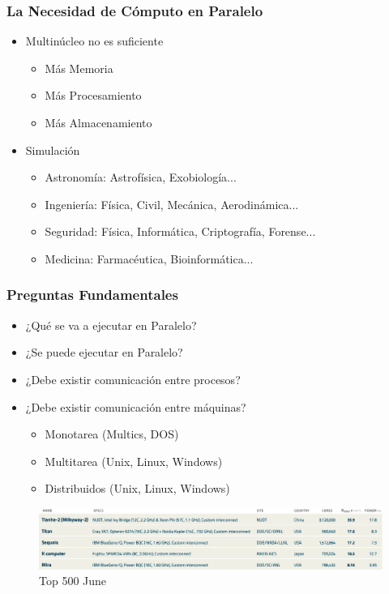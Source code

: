 \begin{frame}
\frametitle{La Necesidad de Cómputo en Paralelo}
\begin{itemize}
\item Multinúcleo no es suficiente
	\begin{itemize}
	\item Más Memoria
	\item Más Procesamiento
	\item Más Almacenamiento
	\end{itemize}
\item Simulación
	\begin{itemize}
	\item Astronomía: Astrofísica, Exobiología...
	\item Ingeniería: Física, Civil, Mecánica, Aerodinámica...
	\item Seguridad: Física, Informática, Criptografía, Forense...
	\item Medicina: Farmacéutica, Bioinformática...
	\end{itemize}
\end{itemize}
\end{frame}

\begin{frame}
\frametitle{Preguntas Fundamentales}
\begin{itemize}
\item ¿Qué se va a ejecutar en Paralelo?
\item ¿Se puede ejecutar en Paralelo?
\item ¿Debe existir comunicación entre procesos?
\item ¿Debe existir comunicación entre máquinas?
\begin{itemize}
	\item Monotarea (Multics, DOS)
	\item Multitarea (Unix, Linux, Windows)
	\item Distribuidos (Unix, Linux, Windows)
\end{itemize}
\end{itemize}
\end{frame}

\begin{frame}
 \begin{figure}[ht]
        \centering
        \includegraphics[scale=0.29]{imgs/top500june}
        \caption{Top 500 June}
      \end{figure}
\end{frame}

